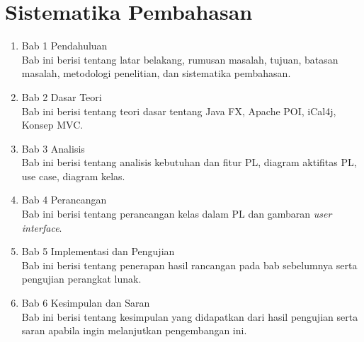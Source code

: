 \section{Sistematika Pembahasan}
\label{sec:sistematika_pembahasan}
\begin{enumerate}
	\item Bab 1 Pendahuluan\\
	Bab ini berisi tentang latar belakang, rumusan masalah, tujuan, batasan masalah, metodologi penelitian, dan sistematika pembahasan.
	\item Bab 2 Dasar Teori\\
	Bab ini berisi tentang teori dasar tentang Java FX, Apache POI, iCal4j, Konsep MVC.
	\item Bab 3 Analisis\\
	Bab ini berisi tentang analisis kebutuhan dan fitur PL, diagram aktifitas PL, use case, diagram kelas.
	\item Bab 4 Perancangan\\
	Bab ini berisi tentang perancangan kelas dalam PL dan gambaran \textit{user interface}.
	\item Bab 5 Implementasi dan Pengujian\\
	Bab ini berisi tentang penerapan hasil rancangan pada bab sebelumnya serta pengujian perangkat lunak.
	\item Bab 6 Kesimpulan dan Saran\\
	Bab ini berisi tentang kesimpulan yang didapatkan dari hasil pengujian serta saran apabila ingin melanjutkan pengembangan ini.
\end{enumerate}
